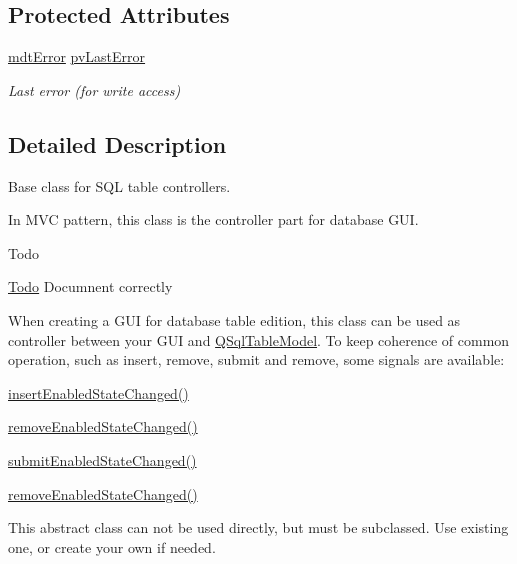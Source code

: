 \subsection*{Protected Attributes}
\begin{DoxyCompactItemize}
\item 
\hyperlink{classmdt_error}{mdt\-Error} \hyperlink{classmdt_abstract_sql_table_controller_ab84254456716151208b9e5eb3610a90b}{pv\-Last\-Error}
\begin{DoxyCompactList}\small\item\em Last error (for write access) \end{DoxyCompactList}\end{DoxyCompactItemize}


\subsection{Detailed Description}
Base class for S\-Q\-L table controllers. 

In M\-V\-C pattern, this class is the controller part for database G\-U\-I. \begin{DoxyRefDesc}{Todo}
\item[\hyperlink{todo__todo000001}{Todo}]Documnent correctly\end{DoxyRefDesc}


When creating a G\-U\-I for database table edition, this class can be used as controller between your G\-U\-I and \hyperlink{class_q_sql_table_model}{Q\-Sql\-Table\-Model}. To keep coherence of common operation, such as insert, remove, submit and remove, some signals are available\-:
\begin{DoxyItemize}
\item \hyperlink{classmdt_abstract_sql_table_controller_af0f0bf9f3aef759a1babb2dd5b91950e}{insert\-Enabled\-State\-Changed()}
\item \hyperlink{classmdt_abstract_sql_table_controller_adcac9058c974b76574fc5aaed3512c8c}{remove\-Enabled\-State\-Changed()}
\item \hyperlink{classmdt_abstract_sql_table_controller_a3690e3c30d0fb7519915022253372376}{submit\-Enabled\-State\-Changed()}
\item \hyperlink{classmdt_abstract_sql_table_controller_adcac9058c974b76574fc5aaed3512c8c}{remove\-Enabled\-State\-Changed()}
\end{DoxyItemize}

This abstract class can not be used directly, but must be subclassed. Use existing one, or create your own if needed.

